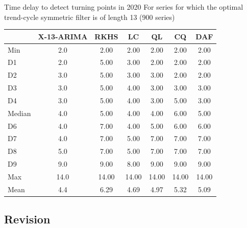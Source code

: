 \documentclass[10pt,xcolor=table,color={dvipsnames,usenames},ignorenonframetext,usepdftitle=false,english]{beamer}
\newcommand\1{\mathds{1}}
\begin{document}
\begin{frame}{Time delay to detect turning points in 2020}
\protect\hypertarget{time-delay-to-detect-turning-points-in-2020}{}
For series for which the optimal trend-cycle symmetric filter is of
length 13 (900 series)

\footnotesize



\begin{table}
\centering
\begin{tabular}[t]{lDFDEEE}
\toprule
  & \textbf<2>{X-13-ARIMA} & \textbf<4>{RKHS} & \textbf<2>{LC} & \textbf<3>{QL} & \textbf<3>{CQ} & \textbf<3>{DAF}\\
\midrule
{Min} & {2.0} & {2.00} & {2.00} & {2.00} & {2.00} & {2.00}\\
D1 & 2.0 & 5.00 & 3.00 & 2.00 & 2.00 & 2.00\\
{D2} & {3.0} & {5.00} & {3.00} & {3.00} & {2.00} & {2.00}\\
D3 & 3.0 & 5.00 & 4.00 & 3.00 & 3.00 & 3.00\\
{D4} & {3.0} & {5.00} & {4.00} & {3.00} & {5.00} & {3.00}\\
Median & 4.0 & 5.00 & 4.00 & 4.00 & 6.00 & 5.00\\
{D6} & {4.0} & {7.00} & {4.00} & {5.00} & {6.00} & {6.00}\\
D7 & 4.0 & 7.00 & 5.00 & 7.00 & 7.00 & 7.00\\
{D8} & {5.0} & {7.00} & {5.00} & {7.00} & {7.00} & {7.00}\\
D9 & 9.0 & 9.00 & 8.00 & 9.00 & 9.00 & 9.00\\
{Max} & {14.0} & {14.00} & {14.00} & {14.00} & {14.00} & {14.00}\\
Mean & 4.4 & 6.29 & 4.69 & 4.97 & 5.32 & 5.09\\
\bottomrule
\end{tabular}
\end{table}
\end{frame}

\hypertarget{revision}{%
\subsection{Revision}\label{revision}}
\end{document}
